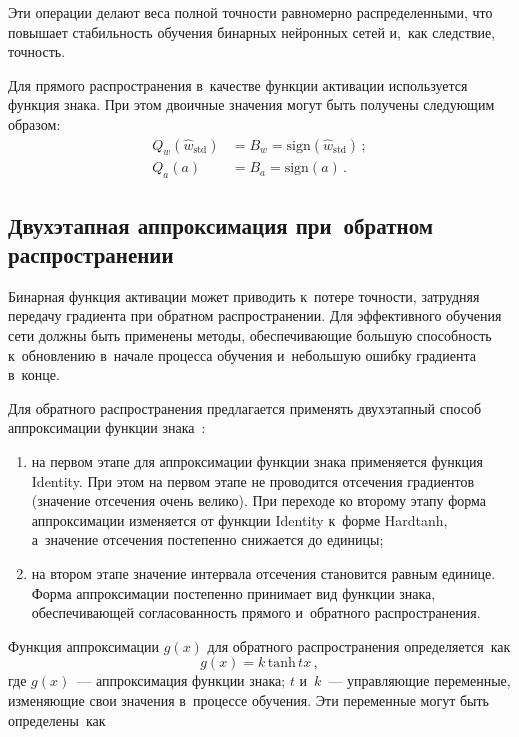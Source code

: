 \begin{multicols}{2}
  

  
  Эти операции делают веса полной точ\-ности рав\-но\-мер\-но распределенными, 
что повышает ста\-биль\-ность обуче\-ния бинарных нейронных сетей и,~как 
следствие, точ\-ность.
  
  Для прямого распространения в~качестве функции активации используется 
функ\-ция знака. При этом двоичные значения могут быть получены  
сле\-ду\-ющим об\-ра\-зом:
  \begin{align*}
  Q_w\left(\hat{w}_{\mathrm{std}}\right) &= B_w =\mathrm{sign}\left( 
\hat{w}_{\mathrm{std}}\right)\,;\\
  Q_a(a) &= B_a =\mathrm{sign}\left(a\right)\,.
  \end{align*}

\subsection{Двухэтапная аппроксимация при~обратном 
распространении}

  Бинарная функция активации может приводить к~потере точ\-ности, за\-труд\-няя 
передачу градиента при обрат\-ном распространении. Для эффективного 
обуче\-ния сети долж\-ны быть применены методы, обес\-пе\-чи\-ва\-ющие большую 
спо\-соб\-ность к~об\-нов\-ле\-нию в~начале процесса обуче\-ния и~небольшую ошиб\-ку 
градиента в~\mbox{конце}.
  
  Для обратного распространения предлагается применять двухэтапный способ 
аппроксимации функ\-ции знака~\cite{5-mal}: 
  \begin{enumerate}[(1)]
\item на первом этапе для аппроксимации функции знака применяется 
функ\-ция Identity. При этом на пер\-вом этапе не проводится отсечения 
градиентов (значение отсечения очень велико). При переходе ко второму 
этапу форма ап\-прок\-си\-ма\-ции изменяется от функ\-ции Identity к~форме 
Hardtanh, а~значение отсечения по\-сте\-пен\-но снижается до еди\-ницы; 
\item на втором этапе значение интервала отсечения становится рав\-ным 
единице. Форма аппроксимации по\-сте\-пен\-но принимает вид функ\-ции знака, 
обес\-пе\-чи\-ва\-ющей со\-гла\-со\-ван\-ность прямого и~об\-рат\-но\-го рас\-про\-стра\-не\-ния. 
  \end{enumerate}
  
  Функция аппроксимации $g(x)$ для обратного распространения опре\-де\-ля\-ет\-ся~как
  $$
  g(x)=k\,\mathrm{tanh}\,tx\,,
  $$
где $g(x)$~--- аппроксимация функции знака; $t$ и~$k$~--- управ\-ля\-ющие 
переменные, из\-ме\-ня\-ющие свои значения в~процессе обуче\-ния. Эти переменные 
могут быть опре\-де\-ле\-ны~как


\end{multicols}
